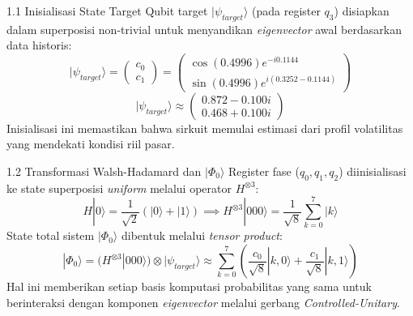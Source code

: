 \begin{frame}{1.1 Inisialisasi State Target}
    Qubit target $| \psi_{target} \rangle$ (pada register $q_3$) disiapkan dalam superposisi non-trivial untuk menyandikan \textit{eigenvector} awal berdasarkan data historis:
    \begin{equation}
        | \psi_{target} \rangle = \begin{pmatrix} c_0 \\ c_1 \end{pmatrix} = \begin{pmatrix} \cos(0.4996) e^{-i0.1144} \\ \sin(0.4996) e^{i(0.3252 - 0.1144)} \end{pmatrix}
    \end{equation}
    \begin{equation}
        | \psi_{target} \rangle \approx \begin{pmatrix} 0.872 - 0.100i \\ 0.468 + 0.100i \end{pmatrix}
    \end{equation}
    Inisialisasi ini memastikan bahwa sirkuit memulai estimasi dari profil volatilitas yang mendekati kondisi riil pasar.
\end{frame}

\begin{frame}{1.2 Transformasi Walsh-Hadamard dan $|\Phi_0\rangle$}
    Register fase ($q_0, q_1, q_2$) diinisialisasi ke state superposisi \textit{uniform} melalui operator $H^{\otimes 3}$:
    \begin{equation}
        H|0\rangle = \frac{1}{\sqrt{2}}(|0\rangle + |1\rangle) \implies H^{\otimes 3}|000\rangle = \frac{1}{\sqrt{8}} \sum_{k=0}^{7} |k\rangle
    \end{equation}
    State total sistem $|\Phi_0\rangle$ dibentuk melalui \textit{tensor product}:
    \begin{equation}
        |\Phi_0\rangle = (H^{\otimes 3} |000\rangle) \otimes |\psi_{target}\rangle \approx \sum_{k=0}^{7} \left( \frac{c_0}{\sqrt{8}}|k,0\rangle + \frac{c_1}{\sqrt{8}}|k,1\rangle \right)
    \end{equation}
    Hal ini memberikan setiap basis komputasi probabilitas yang sama untuk berinteraksi dengan komponen \textit{eigenvector} melalui gerbang \textit{Controlled-Unitary}.
\end{frame}

